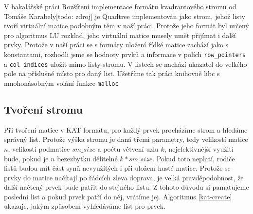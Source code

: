 V bakalářské práci Rozšíření implementace formátu kvadrantového stromu od Tomáše Karabely[todo: zdroj] je Quadtree implementován jako strom, jehož listy tvoří virtuální matice podobným těm v naší práci. Protože jeho formát byl určený pro algoritmus LU rozklad, jeho virtuální matice musely umět přijímat i další prvky. Protože v naší práci se s formáty uložení řídké matice zachází jako s konstantami, rozhodli jsme se hodnoty prvků a informace v polích \texttt{row\_pointers} a \texttt{col\_indices} uložit mimo listy stromu. V listech se nachází ukazatel do velkého pole na příslušné místo pro daný list. Ušetříme tak práci knihovně libc s mnohonásobným volání funkce \texttt{malloc}

\subsection{Tvoření stromu}

Při tvoření matice v KAT formátu, pro každý prvek procházíme strom a hledáme správný list. Protože výška stromu je daná třemi parametry, tedy velikostí matice $n$, velikostí podmatice $sm\_size$ a počtu větvení uzlu $k$, nejefektivnější využití bude, pokud je $n$ bezezbytku dělitelné $k * sm\_size$. Pokud toto neplatí, rodiče listů budou mít část synů nevyužitých i při uložení husté matice. Protože se prvky do matice načítají po řádcích zleva doprava, je velká pravděpodobnost, že další načtený prvek bude patřit do stejného listu. Z tohoto důvodu si pamatujeme poslední list a pokud prvek patří do něj, vrátíme jej. Algoritmus \ref{kat-create} ukazuje, jakým způsobem vyhledáváme list pro prvek.


